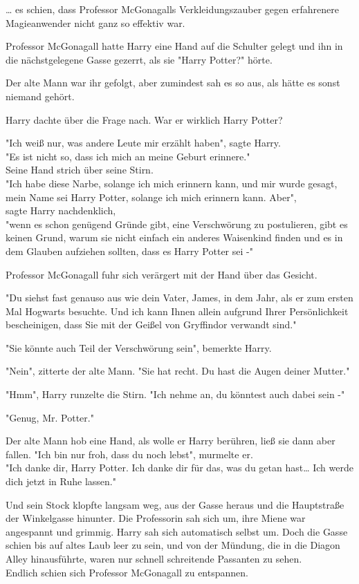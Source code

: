 {… es schien, dass Professor McGonagalls Verkleidungszauber gegen erfahrenere Magieanwender nicht ganz so effektiv war.

Professor McGonagall hatte Harry eine Hand auf die Schulter gelegt und ihn in die nächstgelegene Gasse gezerrt, als sie "Harry Potter?" hörte.

Der alte Mann war ihr gefolgt, aber zumindest sah es so aus, als hätte es sonst niemand gehört.

Harry dachte über die Frage nach. War er wirklich Harry Potter?

"Ich weiß nur, was andere Leute mir erzählt haben", sagte Harry.\\ "Es ist nicht so, dass ich mich an meine Geburt erinnere."\\ Seine Hand strich über seine Stirn.\\ "Ich habe diese Narbe, solange ich mich erinnern kann, und mir wurde gesagt, mein Name sei Harry Potter, solange ich mich erinnern kann. Aber",\\ sagte Harry nachdenklich,\\ "wenn es schon genügend Gründe gibt, eine Verschwörung zu postulieren, gibt es keinen Grund, warum sie nicht einfach ein anderes Waisenkind finden und es in dem Glauben aufziehen sollten, dass es Harry Potter sei -"

Professor McGonagall fuhr sich verärgert mit der Hand über das Gesicht.

"Du siehst fast genauso aus wie dein Vater, James, in dem Jahr, als er zum ersten Mal Hogwarts besuchte. Und ich kann Ihnen allein aufgrund Ihrer Persönlichkeit bescheinigen, dass Sie mit der Geißel von Gryffindor verwandt sind."

"Sie könnte auch Teil der Verschwörung sein", bemerkte Harry.

"Nein", zitterte der alte Mann. "Sie hat recht. Du hast die Augen deiner Mutter."

"Hmm", Harry runzelte die Stirn. "Ich nehme an, du könntest auch dabei sein -"

"Genug, Mr. Potter."

Der alte Mann hob eine Hand, als wolle er Harry berühren, ließ sie dann aber fallen. "Ich bin nur froh, dass du noch lebst", murmelte er.\\ "Ich danke dir, Harry Potter. Ich danke dir für das, was du getan hast… Ich werde dich jetzt in Ruhe lassen."

Und sein Stock klopfte langsam weg, aus der Gasse heraus und die Hauptstraße der Winkelgasse hinunter. Die Professorin sah sich um, ihre Miene war angespannt und grimmig. Harry sah sich automatisch selbst um. Doch die Gasse schien bis auf altes Laub leer zu sein, und von der Mündung, die in die Diagon Alley hinausführte, waren nur schnell schreitende Passanten zu sehen.\\ Endlich schien sich Professor McGonagall zu entspannen.

}
